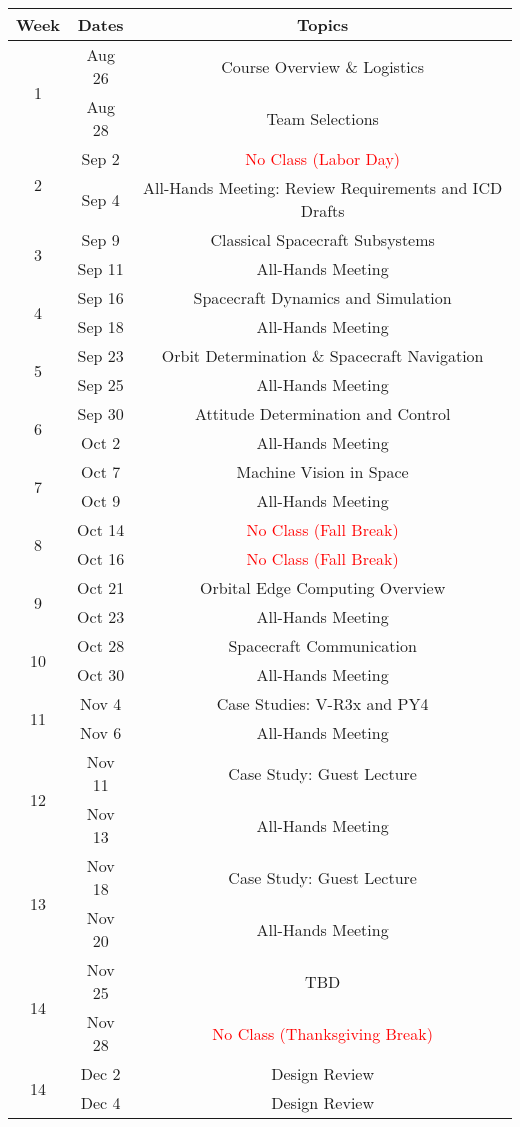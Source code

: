 \documentclass[11pt,letterpaper]{article}
\begin{document}
\begin{tabular}{c|c|c}
	Week & Dates & Topics \\
	\hline
	\multirow{2}{*}{1} & Aug 26 & Course Overview \& Logistics \\
	 & Aug 28 & Team Selections \\
	\hline
	\multirow{2}{*}{2} & Sep 2 & \textcolor{red}{No Class (Labor Day)} \\
	 & Sep 4 & All-Hands Meeting: Review Requirements and ICD Drafts \\
	\hline
	\multirow{2}{*}{3}  & Sep 9 & Classical Spacecraft Subsystems \\
	 & Sep 11 & All-Hands Meeting \\
	\hline
	\multirow{2}{*}{4}  & Sep 16 & Spacecraft Dynamics and Simulation \\
	 & Sep 18 & All-Hands Meeting \\
	\hline
	\multirow{2}{*}{5}  & Sep 23 & Orbit Determination \& Spacecraft Navigation \\
	 & Sep 25 & All-Hands Meeting \\
	\hline
	\multirow{2}{*}{6}  & Sep 30 & Attitude Determination and Control \\
	 & Oct 2 & All-Hands Meeting \\
	\hline
	\multirow{2}{*}{7}  & Oct 7 & Machine Vision in Space \\
	 & Oct 9 & All-Hands Meeting \\
	\hline
	\multirow{2}{*}{8}  & Oct 14 & \textcolor{red}{No Class (Fall Break)} \\
	 & Oct 16 & \textcolor{red}{No Class (Fall Break)} \\
	\hline
	\multirow{2}{*}{9}  & Oct 21 & Orbital Edge Computing Overview \\
	 & Oct 23 & All-Hands Meeting \\
	\hline
	\multirow{2}{*}{10}  & Oct 28 & Spacecraft Communication \\
	 & Oct 30 & All-Hands Meeting \\
	 \hline
	\multirow{2}{*}{11}  & Nov 4 &  Case Studies: V-R3x and PY4 \\
	 & Nov 6 & All-Hands Meeting \\
	 \hline
	\multirow{2}{*}{12}  & Nov 11 & Case Study: Guest Lecture \\
	 & Nov 13 & All-Hands Meeting \\
	 \hline
	\multirow{2}{*}{13}  & Nov 18 & Case Study: Guest Lecture \\
	 & Nov 20 & All-Hands Meeting \\
	 \hline
	\multirow{2}{*}{14}  & Nov 25 & TBD \\
	 & Nov 28 & \textcolor{red}{No Class (Thanksgiving Break)} \\
	 \hline
	\multirow{2}{*}{14}  & Dec 2 & Design Review \\
	 & Dec 4 & Design Review \\
\end{tabular}
\end{document}
